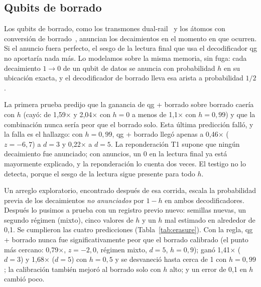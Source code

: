 \documentclass[11pt]{article}
\begin{document}
\subsection{Qubits de borrado}\label{sec:erasure}

Los qubits de borrado, como los transmones dual-rail~\cite{kubica2023erasure} y los átomos con
conversión de borrado~\cite{wu2022erasure}, anuncian los decaimientos en el momento en que ocurren.
Si el anuncio fuera perfecto, el sesgo de la lectura final que usa el decodificador qg no aportaría
nada más. Lo modelamos sobre la misma memoria, sin fuga: cada decaimiento $1\to0$ de un qubit de
datos se anuncia con probabilidad $h$ en su ubicación exacta, y el decodificador de borrado lleva esa
arista a probabilidad $1/2$.

La primera prueba predijo que la ganancia de qg + borrado sobre borrado caería con $h$ (cayó: de
1{,}59$\times$ y 2{,}04$\times$ con $h=0$ a menos de 1{,}1$\times$ con $h=0{,}99$) y que la combinación
nunca sería peor que el borrado solo. Esta última predicción falló, y la falla es el hallazgo: con
$h=0{,}99$, qg + borrado llegó apenas a 0{,}46$\times$ ($z=-6{,}7$) a $d=3$ y 0{,}22$\times$ a $d=5$.
La reponderación T1 supone que ningún decaimiento fue anunciado; con anuncios, un 0 en la lectura
final ya está mayormente explicado, y la reponderación lo cuenta dos veces. El testigo no lo detecta,
porque el sesgo de la lectura sigue presente para todo $h$.

Un arreglo exploratorio, encontrado después de esa corrida, escala la probabilidad previa de los
decaimientos \emph{no anunciados} por $1-h$ en ambos decodificadores. Después lo pusimos a prueba con
un registro previo nuevo: semillas nuevas, un segundo régimen (mixto), cinco valores de $h$ y un $h$
mal estimado en alrededor de 0{,}1. Se cumplieron las cuatro predicciones (Tabla~\ref{tab:erasure}).
Con la regla, qg + borrado nunca fue significativamente peor que el borrado calibrado (el punto más
cercano: 0{,}79$\times$, $z=-2{,}0$, régimen mixto, $d=5$, $h=0{,}9$); ganó 1{,}41$\times$ ($d=3$) y
1{,}68$\times$ ($d=5$) con $h=0{,}5$ y se desvaneció hasta cerca de 1 con $h=0{,}99$; la calibración
también mejoró al borrado solo con $h$ alto; y un error de 0{,}1 en $h$ cambió poco.
\end{document}
